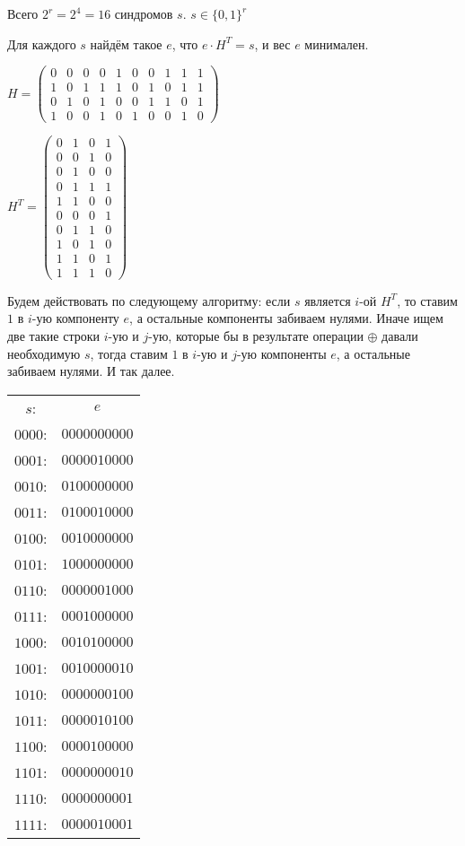 \documentclass{article}
\begin{document}
	Всего $2^r = 2^4 = 16$ синдромов $s$. $s \in \{0, 1\}^r$
	
	 Для каждого $s$ найдём такое $e$, что $e \cdot H^T = s$, и вес $e$ минимален.
	 
	 $
	 H = \left(
	 \begin{array}{cccccccccc}
	 0 & 0 & 0 & 0 & 1 & 0 & 0 & 1 & 1 & 1\\
	 1 & 0 & 1 & 1 & 1 & 0 & 1 & 0 & 1 & 1\\
	 0 & 1 & 0 & 1 & 0 & 0 & 1 & 1 & 0 & 1\\
	 1 & 0 & 0 & 1 & 0 & 1 & 0 & 0 & 1 & 0
	 \end{array}
	 \right)
	 $
	 
	 $
	 H^T = \left(
	 \begin{array}{cccccccccc}
	 0 & 1& 0& 1\\
	 0 &0 &1 &0\\
	 0 &1 &0 &0\\
	 0 &1 &1 &1\\
	 1 &1 &0 &0\\
	 0 &0 &0 &1\\
	 0 &1 &1 &0\\
	 1 &0 &1 &0\\
	 1 &1 &0 &1\\
	 1 &1 &1 &0
	 \end{array}
	 \right)
	 $
	 
	 Будем действовать по следующему алгоритму: если $s$ является $i$-ой $H^T$, то ставим $1$ в $i$-ую компоненту $e$, а остальные компоненты забиваем нулями. Иначе ищем две такие строки $i$-ую и $j$-ую, которые бы в результате операции $\oplus$ давали необходимую $s$, тогда ставим $1$ в $i$-ую и $j$-ую компоненты $e$, а остальные забиваем нулями. И так далее.
	 
	 \begin{center}
	 	\begin{tabular}{cc}
	 		$s$: & $e$ \\
	 		$0000$: & $0000000000$\\
	 		$0001$: & $0000010000$ \\
	 		$0010$: & $0100000000$ \\
	 		$0011$: & $0100010000$ \\
	 		$0100$: & $0010000000$  \\
	 		$0101$: & $1000000000$ \\
	 		$0110$: &$0000001000$ \\
	 		$0111$: & $0001000000$\\
	 		$1000$: &$0010100000$\\
	 		$1001$: & $0010000010$ \\
	 		$1010$: & $0000000100$ \\
	 		$1011$: & $0000010100$ \\
	 		$1100$: & $0000100000$ \\
	 		$1101$: & $0000000010$ \\
	 		$1110$: & $0000000001$ \\
	 		$1111$: & $0000010001$ \\
	 	\end{tabular}
	 \end{center}
 
\end{document}
